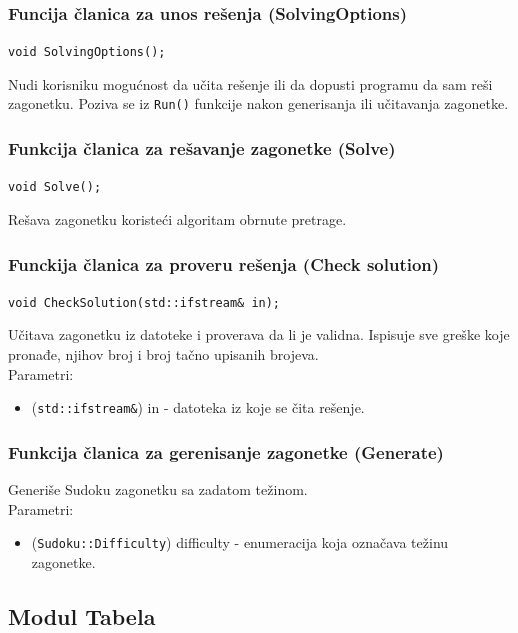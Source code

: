 \documentclass[a4paper]{article}
\begin{document}
    \subsubsection{Funcija članica za unos rešenja (SolvingOptions)}
    \texttt{void SolvingOptions();}
    \par Nudi korisniku mogućnost da učita rešenje ili da dopusti programu da sam reši zagonetku. Poziva se  iz \texttt{Run()} funkcije nakon generisanja 
    ili učitavanja zagonetke.

    \subsubsection{Funkcija članica za rešavanje zagonetke (Solve)}
    \texttt{void Solve();}
    \par Rešava zagonetku koristeći algoritam obrnute pretrage.

    \subsubsection{Funckija članica za proveru rešenja (Check solution)}
    \texttt{void CheckSolution(std::ifstream\& in);}
    \par Učitava zagonetku iz datoteke i proverava da li je validna. Ispisuje sve greške koje pronađe, njihov broj i broj tačno upisanih brojeva.\\
    Parametri:
    \begin{itemize}
        \item (\texttt{std::ifstream\&}) in - datoteka iz koje se čita rešenje.
    \end{itemize}

    \subsubsection{Funkcija članica za gerenisanje zagonetke (Generate)}
    \par Generiše Sudoku zagonetku sa zadatom težinom. \\
    Parametri:
    \begin{itemize}
        \item (\texttt{Sudoku::Difficulty}) difficulty - enumeracija koja označava težinu zagonetke.
    \end{itemize}
   
   
    \subsection{Modul Tabela}
    
\end{document}
